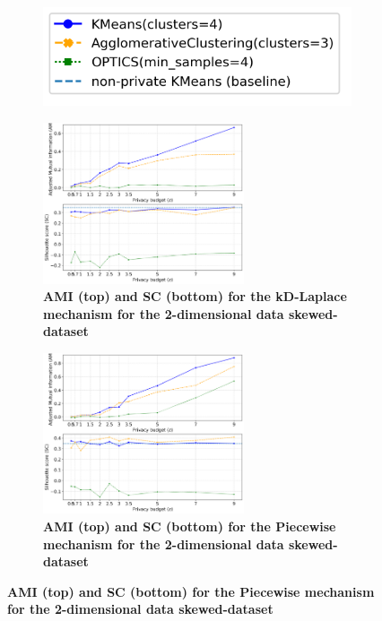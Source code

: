 \newpage
\begin{figure}[H]
    \centering
    \begin{subfigure}{0.3\textwidth}
        \includegraphics[width=\textwidth]{Results/kd-laplace/kd-Laplace/skewed-dataset/legend_2.png}
    \end{subfigure}
    \begin{subfigure}{1\textwidth}
        \centering
        \caption{\textbf{AMI (top) and SC (bottom) for the kD-Laplace mechanism for the 2-dimensional data skewed-dataset}}
        \includegraphics[width=0.65\textwidth]{Results/kd-laplace/kd-Laplace/skewed-dataset/ami-and-sc_2_dimensions.png}
        \centering
    \end{subfigure}
    \begin{subfigure}{1\textwidth}
        \centering
        \caption{\textbf{AMI (top) and SC (bottom) for the Piecewise mechanism for the 2-dimensional data skewed-dataset}}
        \includegraphics[width=0.65\textwidth]{Results/kd-laplace/piecewise/skewed-dataset/ami-and-sc_2_dimensions.png}
    \end{subfigure}
    \label{fig:validation-skewed-dataset_comparison_2d-laplace}
\end{figure}
\newpage
